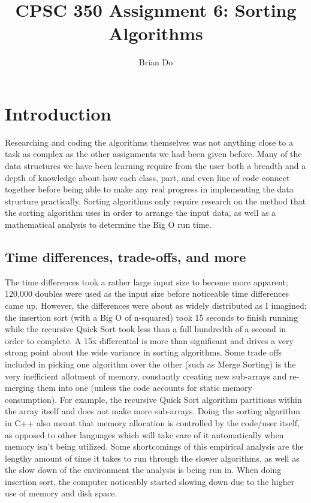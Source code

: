 \documentclass[journal]{IEEEtran}
\begin{document}
\title{CPSC 350 Assignment 6: Sorting Algorithms}

\author{Brian Do}

\maketitle

\section{Introduction}
    Researching and coding the algorithms themselves was not anything close to a task as complex as the other assignments we had been given before. Many of the data structures we have been learning require from the user both a breadth and a depth of knowledge about how each class, part, and even line of code connect together before being able to make any real progress in implementing the data structure practically. Sorting algorithms only require research on the method that the sorting algorithm uses in order to arrange the input data, as well as a mathematical analysis to determine the Big O run time.

\subsection{Time differences, trade-offs, and more}
    The time differences took a rather large input size to become more apparent; 120,000 doubles were used as the input size before noticeable time differences came up. However, the differences were about as widely distributed as I imagined; the insertion sort (with a Big O of n-squared) took 15 seconds to finish running while the recursive Quick Sort took less than a full hundredth of a second in order to complete. A 15x differential is more than significant and drives a very strong point about the wide variance in sorting algorithms. Some trade offs included in picking one algorithm over the other (such as Merge Sorting) is the very inefficient allotment of memory, constantly creating new sub-arrays and re-merging them into one (unless the code accounts for static memory consumption). For example, the recursive Quick Sort algorithm partitions within the array itself and does not make more sub-arrays. Doing the sorting algorithm in C++ also meant that memory allocation is controlled by the code/user itself, as opposed to other languages which will take care of it automatically when memory isn't being utilized. Some shortcomings of this empirical analysis are the lengthy amount of time it takes to run through the slower algorithms, as well as the slow down of the environment the analysis is being run in. When doing insertion sort, the computer noticeably started slowing down due to the higher use of memory and disk space. 
\end{document}
